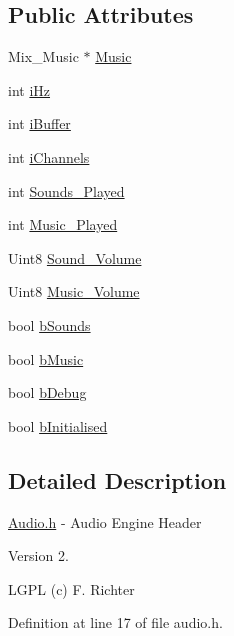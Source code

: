 \subsection*{Public Attributes}
\begin{DoxyCompactItemize}
\item 
Mix\-\_\-\-Music $\ast$ \hyperlink{classc_audio_a1079677c50a60ef5e6a3c09cd2af8d91}{Music}
\item 
int \hyperlink{classc_audio_a33a95a4128134a55b2a68d25d60ae314}{i\-Hz}
\item 
int \hyperlink{classc_audio_a9bd6aa3fef6284334ee9b726c0cf1a1b}{i\-Buffer}
\item 
int \hyperlink{classc_audio_a3f946cdea09fd857bee05b8a7326a8d7}{i\-Channels}
\item 
int \hyperlink{classc_audio_a9ec9fc3a055a17a90e5611570058487f}{Sounds\-\_\-\-Played}
\item 
int \hyperlink{classc_audio_a9f20d77fb103d6e1f87819ad406a5f0d}{Music\-\_\-\-Played}
\item 
Uint8 \hyperlink{classc_audio_a3ac7aee05ebb4a7cdcfb5668226f6349}{Sound\-\_\-\-Volume}
\item 
Uint8 \hyperlink{classc_audio_aa7d2c11847671823d34a694ad797bb75}{Music\-\_\-\-Volume}
\item 
bool \hyperlink{classc_audio_a5ad87dd6c804f68dd430f778f90cf38e}{b\-Sounds}
\item 
bool \hyperlink{classc_audio_abe75bf46e35f528400dcb2e5113ae0b8}{b\-Music}
\item 
bool \hyperlink{classc_audio_ab36788ba00195b8c4917e2e304d85b0d}{b\-Debug}
\item 
bool \hyperlink{classc_audio_acb49d8cf5904830d9307bc426fe4cb3d}{b\-Initialised}
\end{DoxyCompactItemize}


\subsection{Detailed Description}
\hyperlink{audio_8h}{Audio.\-h} -\/ Audio Engine Header

Version 2.

L\-G\-P\-L (c) F. Richter 

Definition at line 17 of file audio.\-h.



